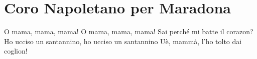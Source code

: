 \section{Coro Napoletano per Maradona}
\begin{canzone}
O mama, mama, mama! O mama, mama, mama!
Sai perché mi batte il corazon? 
Ho ucciso un santannino, ho ucciso un santannino
Uè, mammà, l'ho tolto dai coglion!
\end{canzone}
